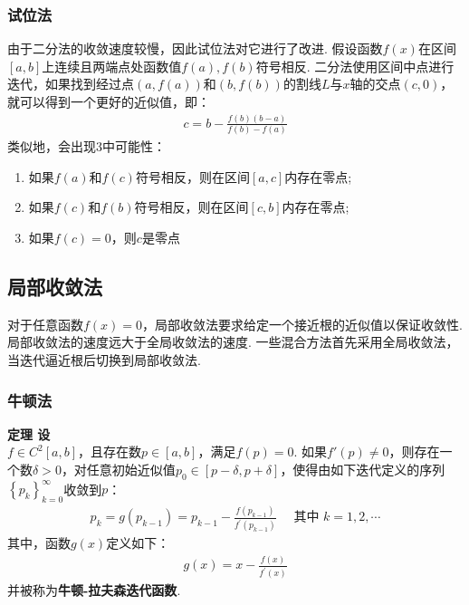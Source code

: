 \documentclass[UTF8]{ctexart}
\newenvironment{dingli}[2][定理]
{\begin{mdframed}[backgroundcolor=gray!20] \textbf{#1 #2} \\}
	{\end{mdframed}}
\begin{document}
\subsubsection{试位法}
由于二分法的收敛速度较慢，因此试位法对它进行了改进. 假设函数$f(x)$在区间$[a,b]$上连续且两端点处函数值$f(a), f(b)$符号相反. 
二分法使用区间中点进行迭代，如果找到经过点$(a,f(a))$和$(b,f(b))$的割线$L$与$x$轴的交点$(c,0)$，就可以得到一个更好的近似值，即：
\begin{align}
	c=b-\frac{f(b)(b-a)}{f(b)-f(a)}
\end{align}
类似地，会出现3中可能性：
\begin{enumerate}
	\item 如果$f(a)$和$f(c)$符号相反，则在区间$[a,c]$内存在零点;
	\item 如果$f(c)$和$f(b)$符号相反，则在区间$[c,b]$内存在零点;
	\item 如果$f(c)=0$，则$c$是零点
\end{enumerate}

\subsection{局部收敛法}
对于任意函数$f(x)=0$，局部收敛法要求给定一个接近根的近似值以保证收敛性.
局部收敛法的速度远大于全局收敛法的速度. 
一些混合方法首先采用全局收敛法，当迭代逼近根后切换到局部收敛法.

\subsubsection{牛顿法}

\begin{dingli}{1}
	设$f \in C^{2}[a,b]$，且存在数$p \in [a,b]$，满足$f(p)=0$. 如果$f'(p) \neq 0$，则存在一个数$\delta > 0$，对任意初始近似值$p_{0} \in [p-\delta,p+\delta]$，使得由如下迭代定义的序列$\left\{p_{k}\right\}_{k=0}^{\infty}$收敛到$p$：
	\begin{align}
		p_{k}=g\left(p_{k-1}\right)=p_{k-1}-\frac{f\left(p_{k-1}\right)}{f^{\prime}\left(p_{k-1}\right)} \quad \text { 其中 } k=1,2, \cdots
	\end{align}
	其中，函数$g(x)$定义如下：
	\begin{align}
		g(x)=x-\frac{f(x)}{f^{\prime}(x)}
	\end{align}
	并被称为\textbf{牛顿-拉夫森迭代函数}.
\end{dingli}
\end{document}
